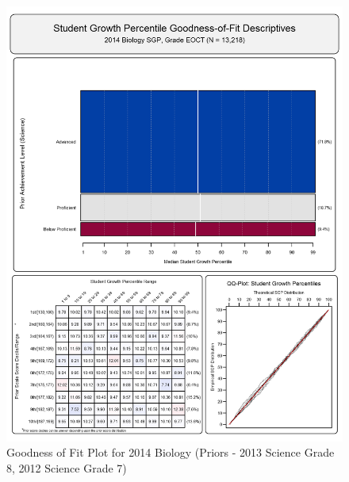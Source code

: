 \documentclass[12pt]{article}
\begin{document}
\begin{figure}[htbp]
\centering
\includegraphics{../img/Goodness_of_Fit/BIOLOGY.2014/2014_BIOLOGY_EOCT;2013_SCIENCE_8;2012_SCIENCE_7.png}
\caption{Goodness of Fit Plot for 2014 Biology (Priors - 2013 Science
Grade 8, 2012 Science Grade 7)}
\end{figure}
\end{document}
